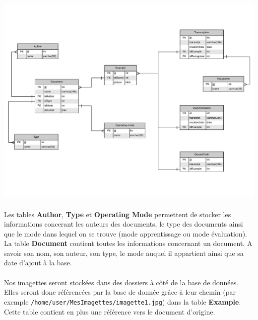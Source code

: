 \begin{mdframed}[frametitle={Figure 7 : Modèle entité association de la Base de données}, innerbottommargin=10]
\begin{center}
\includegraphics[scale=0.6]{Modele_entite_association.pdf}
\end{center}
\end{mdframed}

\paragraph{}

Les tables \textbf{Author}, \textbf{Type} et \textbf{Operating Mode} permettent
de stocker les informations concerant les auteurs des documents, le type des
documents ainsi que le mode dans lequel on se trouve (mode apprentissage ou
mode évaluation). La table \textbf{Document} contient toutes les informations
concernant un document. A savoir son nom, son auteur, son type, le mode auquel
il appartient ainsi que sa date d’ajout à la base.

\paragraph{}
Nos imagettes seront stockées dans des dossiers à côté de la base de données.
Elles seront donc référencées par la base de donnée grâce à leur chemin (par
exemple \texttt{/home/user/MesImagettes/imagette1.jpg}) dans la table
\textbf{Example}. Cette table contient en plus une référence vers le document
d’origine.

\paragraph{}

